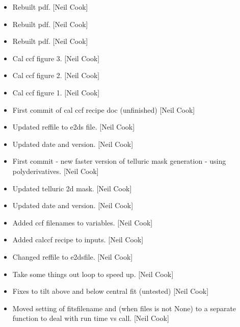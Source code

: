 \documentclass[a4paper,10pt,english]{report}
\begin{document}
\label{\detokenize{misc/changelog:id480}}\begin{itemize}
\item {} 
Rebuilt pdf. {[}Neil Cook{]}

\item {} 
Rebuilt pdf. {[}Neil Cook{]}

\item {} 
Rebuilt pdf. {[}Neil Cook{]}

\item {} 
Cal ccf figure 3. {[}Neil Cook{]}

\item {} 
Cal ccf figure 2. {[}Neil Cook{]}

\item {} 
Cal ccf figure 1. {[}Neil Cook{]}

\item {} 
First commit of cal ccf recipe doc (unfinished) {[}Neil Cook{]}

\item {} 
Updated reffile to e2ds file. {[}Neil Cook{]}

\item {} 
Updated date and version. {[}Neil Cook{]}

\item {} 
First commit - new faster version of telluric mask generation - using
polyderivatives. {[}Neil Cook{]}

\item {} 
Updated telluric 2d mask. {[}Neil Cook{]}

\item {} 
Updated date and version. {[}Neil Cook{]}

\item {} 
Added ccf filenames to variables. {[}Neil Cook{]}

\item {} 
Added calccf recipe to inputs. {[}Neil Cook{]}

\item {} 
Changed reffile to e2dsfile. {[}Neil Cook{]}

\item {} 
Take some things out loop to speed up. {[}Neil Cook{]}

\item {} 
Fixes to tilt above and below central fit (untested) {[}Neil Cook{]}

\item {} 
Moved setting of fitsfilename and  (when files is not
None) to a separate function to deal with run time vs call. {[}Neil
Cook{]}


\end{itemize}
\end{document}
